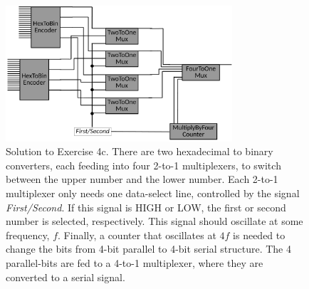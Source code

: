 \documentclass[10pt]{article}
\begin{document}
\begin{enumerate}
\begin{figure}[ht]
\end{figure}
\begin{figure}[hb]
\centering
\includegraphics[width=0.75\textwidth]{figures/design6.pdf}
\caption{\label{fig:enc2} Solution to Exercise 4c.  There are two hexadecimal to binary converters, each feeding into four 2-to-1 multiplexers, to switch between the upper number and the lower number.  Each 2-to-1 multiplexer only needs one data-select line, controlled by the signal \textit{First/Second}.  If this signal is HIGH or LOW, the first or second number is selected, respectively.  This signal should oscillate at some frequency, $f$.  Finally, a counter that oscillates at $4f$ is needed to change the bits from 4-bit parallel to 4-bit serial structure.  The 4 parallel-bits are fed to a 4-to-1 multiplexer, where they are converted to a serial signal.}
\end{figure}
\end{enumerate}

\clearpage
\end{document}
